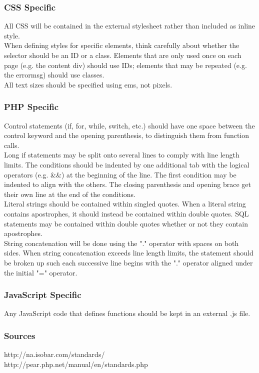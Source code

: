 		\subsubsection{CSS Specific}
			All CSS will be contained in the external stylesheet rather than included as inline style.\\When defining styles for specific elements, think carefully about whether the selector should be an ID or a class. Elements that are only used once on each page (e.g. the content div) should use IDs; elements that may be repeated (e.g. the errormsg) should use classes.\\All text sizes should be specified using ems, not pixels.
			
		\subsubsection{PHP Specific}
			Control statements (if, for, while, switch, etc.) should have one space between the control keyword and the opening parenthesis, to distinguish them from function calls.\\Long if statements may be split onto several lines to comply with line length limits. The conditions should be indented by one additional tab with the logical operators (e.g. \&\&) at the beginning of the line. The first condition may be indented to align with the others. The closing parenthesis and opening brace get their own line at the end of the conditions.\\Literal strings should be contained within singled quotes. When a literal string contains apostrophes, it should instead be contained within double quotes. SQL statements may be contained within double quotes whether or not they contain apostrophes.\\String concatenation will be done using the "." operator with spaces on both sides. When string concatenation exceeds line length limits, the statement should be broken up such each successive line begins with the "." operator aligned under the initial "=" operator.
			
		\subsubsection{JavaScript Specific}
			Any JavaScript code that defines functions should be kept in an external .js file.
			
		\subsubsection{Sources}
			http://na.isobar.com/standards/\\
			http://pear.php.net/manual/en/standards.php
